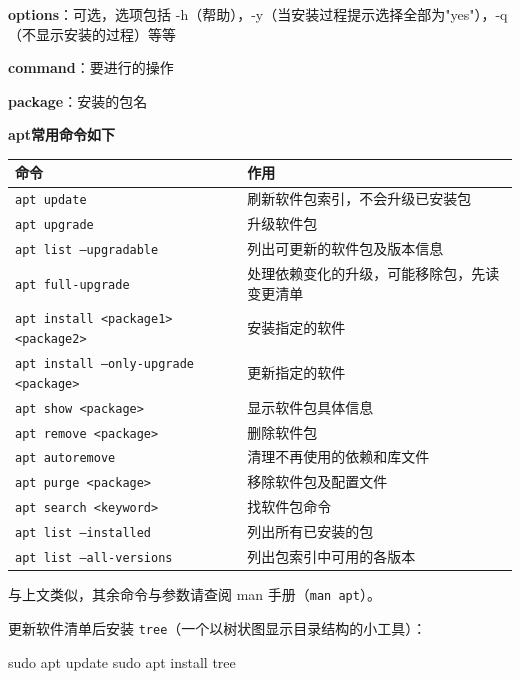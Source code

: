 \textbf{options}：可选，选项包括 -h（帮助），-y（当安装过程提示选择全部为"yes"），-q（不显示安装的过程）等等

\textbf{command}：要进行的操作

\textbf{package}：安装的包名\\


\begin{table}[H]\centering
\textbf{apt常用命令如下}

	\begin{tabular}{p{}p{}}
		\toprule[1.5pt]
		命令 & 作用\\
		\midrule[1pt]
		\texttt{apt  update}	&刷新软件包索引，不会升级已安装包\\
		\texttt{apt  upgrade}	&升级软件包\\
		\texttt{apt  list   --upgradable}		&列出可更新的软件包及版本信息\\
		\texttt{apt  full-upgrade}	&处理依赖变化的升级，可能移除包，先读变更清单\\
		\texttt{apt  install   \textless package1\textgreater   \textless package2\textgreater}	&安装指定的软件\\
		\texttt{apt  install   --only-upgrade  \textless package\textgreater}		&更新指定的软件\\
		\texttt{apt  show   \textless package\textgreater}	&显示软件包具体信息\\
		\texttt{apt  remove   \textless package\textgreater}		&删除软件包\\
		\texttt{apt  autoremove}		&清理不再使用的依赖和库文件\\
		\texttt{apt  purge \textless package\textgreater}		&移除软件包及配置文件\\
		\texttt{apt  search   \textless keyword\textgreater}		&找软件包命令\\
		\texttt{apt  list   --installed}		&列出所有已安装的包\\
		\texttt{apt  list   --all-versions}	&列出包索引中可用的各版本\\
		\bottomrule[1.5pt]
	\end{tabular}
\end{table}


与上文类似，其余命令与参数请查阅 man 手册（\texttt{man apt}）。

\begin{example}
更新软件清单后安装 \texttt{tree}（一个以树状图显示目录结构的小工具）：


\begin{tbash}
sudo apt update
sudo apt install tree
\end{tbash}


\end{example}

